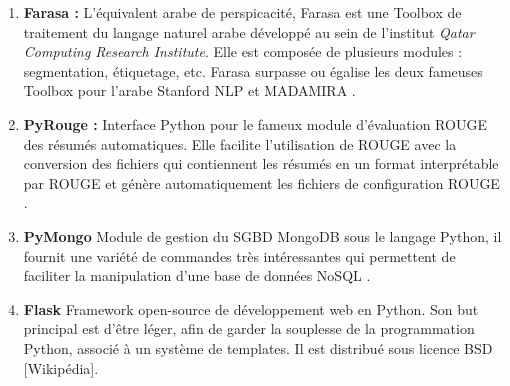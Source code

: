 \begin{enumerate}[leftmargin=*]
                \item{\textbf{Farasa : }}
                L'équivalent arabe de \textquotedbl perspicacité\textquotedbl, Farasa est une Toolbox de traitement du langage naturel arabe développé au sein de l'institut \emph{Qatar Computing Research Institute}. Elle est composée de plusieurs modules : segmentation, étiquetage, etc. Farasa surpasse ou égalise les deux fameuses Toolbox pour l'arabe Stanford NLP et MADAMIRA \cite{farasa}.\\

                \item{\textbf{PyRouge : }}
                Interface Python pour le fameux module d'évaluation ROUGE des résumés automatiques. Elle facilite l'utilisation de ROUGE avec la conversion des fichiers qui contiennent les résumés en un format interprétable par ROUGE et génère automatiquement les fichiers de configuration ROUGE \cite{pyrouge}.\\

                \item{\textbf{PyMongo}}
                Module de gestion du SGBD MongoDB sous le langage Python, il fournit une variété de commandes très intéressantes qui permettent de faciliter la manipulation d'une base de données NoSQL \cite{pymongo}.\\

                \item{\textbf{Flask}}\label{flask}
                Framework open-source de développement web en Python. Son but principal est d'être léger, afin de garder la souplesse de la programmation Python, associé à un système de templates. Il est distribué sous licence BSD [Wikipédia].
            \end{enumerate}

